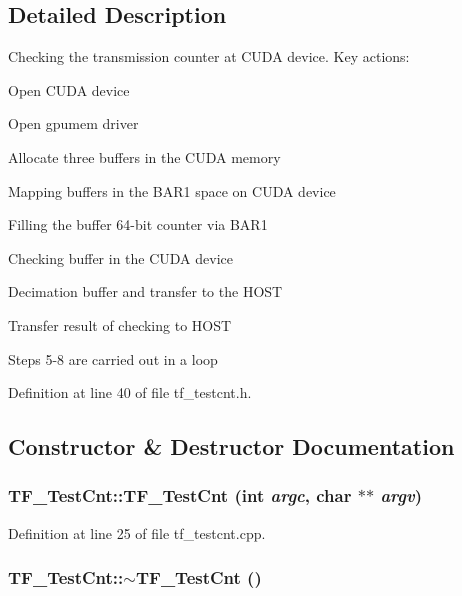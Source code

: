 \subsection{Detailed Description}
Checking the transmission counter at CUDA device. Key actions:
\begin{DoxyEnumerate}
\item Open CUDA device
\item Open gpumem driver
\item Allocate three buffers in the CUDA memory
\item Mapping buffers in the BAR1 space on CUDA device
\item Filling the buffer 64-\/bit counter via BAR1
\item Checking buffer in the CUDA device
\item Decimation buffer and transfer to the HOST
\item Transfer result of checking to HOST
\end{DoxyEnumerate}

Steps 5-\/8 are carried out in a loop 

Definition at line 40 of file tf\_\-testcnt.h.

\subsection{Constructor \& Destructor Documentation}
\hypertarget{classTF__TestCnt_a383dec3bead32626029801edceb9e73d}{
\subsubsection[{TF\_\-TestCnt}]{\setlength{\rightskip}{0pt plus 5cm}TF\_\-TestCnt::TF\_\-TestCnt (int {\em argc}, \/  char $\ast$$\ast$ {\em argv})}}
\label{classTF__TestCnt_a383dec3bead32626029801edceb9e73d}


Definition at line 25 of file tf\_\-testcnt.cpp.\hypertarget{classTF__TestCnt_a05aac39696c9db049193b3a49a389521}{
\subsubsection[{$\sim$TF\_\-TestCnt}]{\setlength{\rightskip}{0pt plus 5cm}TF\_\-TestCnt::$\sim$TF\_\-TestCnt ()}}
\label{classTF__TestCnt_a05aac39696c9db049193b3a49a389521}


